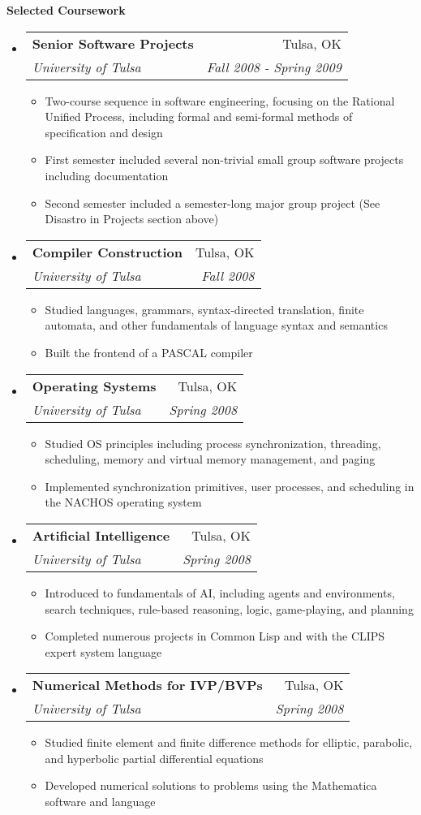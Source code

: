 \documentclass[letterpaper,11pt]{article}
\makeatletter
\newcommand{\resitem}[1]{\item #1 \vspace{-2pt}}
\newcommand{\resheading}[1]{{\large \colorbox{mygrey}{\begin{minipage}{\textwidth}{\textbf{#1 \vphantom{p\^{E}}}}\end{minipage}}}}
\newcommand{\ressubheading}[4]{
\begin{tabular*}{6.5in}{l@{\extracolsep{\fill}}r}
		\textbf{#1} & #2 \\
		\textit{#3} & \textit{#4} \\
\end{tabular*}\vspace{-6pt}}
\makeatother
\begin{document}
\resheading{Selected Coursework}
\begin{itemize}
\item
	\ressubheading{Senior Software Projects}{Tulsa, OK}{University of Tulsa}{Fall 2008 - Spring 2009}
	\begin{itemize}
		\resitem{Two-course sequence in software engineering, focusing on the Rational Unified Process, including formal and semi-formal methods of specification and design}
		\resitem{First semester included several non-trivial small group software projects including documentation}
		\resitem{Second semester included a semester-long major group project (See Disastro in Projects section above)}
	\end{itemize}
\item
	\ressubheading{Compiler Construction}{Tulsa, OK}{University of Tulsa}{Fall 2008}
	\begin{itemize}
		\resitem{Studied languages, grammars, syntax-directed translation, finite automata, and other fundamentals of language syntax and semantics}
		\resitem{Built the frontend of a PASCAL compiler}
	\end{itemize}
\item
	\ressubheading{Operating Systems}{Tulsa, OK}{University of Tulsa}{Spring 2008}
	\begin{itemize}
		\resitem{Studied OS principles including process synchronization, threading, scheduling, memory and virtual memory management, and paging}
		\resitem{Implemented synchronization primitives, user processes, and scheduling in the NACHOS operating system}
	\end{itemize}
\item
	\ressubheading{Artificial Intelligence}{Tulsa, OK}{University of Tulsa}{Spring 2008}
	\begin{itemize}
		\resitem{Introduced to fundamentals of AI, including agents and environments, search techniques, rule-based reasoning, logic, game-playing, and planning}
		\resitem{Completed numerous projects in Common Lisp and with the CLIPS expert system language}
	\end{itemize}
\item
	\ressubheading{Numerical Methods for IVP/BVPs}{Tulsa, OK}{University of Tulsa}{Spring 2008}
	\begin{itemize}
		\resitem{Studied finite element and finite difference methods for elliptic, parabolic, and hyperbolic partial differential equations}
		\resitem{Developed numerical solutions to problems using the Mathematica software and language}
	\end{itemize}

\end{itemize}
\end{document}
